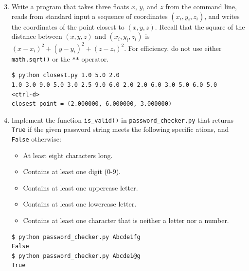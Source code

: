 \documentclass[8pt,a4paper,compress]{beamer}
\begin{document}
\begin{frame}[fragile]
\begin{enumerate}\setcounter{enumi}{2}
\item Write a program that takes three floats $x$, $y$, and $z$ from the command line, reads from standard input a sequence of coordinates $(x_i, y_i, z_i)$, and writes the coordinates of the point closest to $(x, y, z)$. Recall that the square of the distance between $(x, y, z)$ and $(x_i, y_i, z_i)$ is $(x-x_i)^2+(y-y_i)^2+(z-z_i)^2$. For efficiency, do not use either \lstinline{math.sqrt()} or the \lstinline{**} operator.

\begin{lstlisting}[language={}]
$ python closest.py 1.0 5.0 2.0
1.0 3.0 9.0 5.0 3.0 2.5 9.0 6.0 2.0 2.0 6.0 3.0 5.0 6.0 5.0
<ctrl-d>
closest point = (2.000000, 6.000000, 3.000000)
\end{lstlisting}

\item  Implement the function \lstinline{is_valid()} in \lstinline{password_checker.py} that returns \lstinline{True} if the given password string meets the following specific
ations, and \lstinline{False} otherwise:
\begin{itemize}
\item At least eight characters long.
\item Contains at least one digit (0-9).
\item Contains at least one uppercase letter.
\item Contains at least one lowercase letter.
\item Contains at least one character that is neither a letter nor a number.
\end{itemize}
\begin{lstlisting}
$ python password_checker.py Abcde1fg
False
$ python password_checker.py Abcde1@g
True
\end{lstlisting} 
\end{enumerate}
\end{frame}
\end{document}
